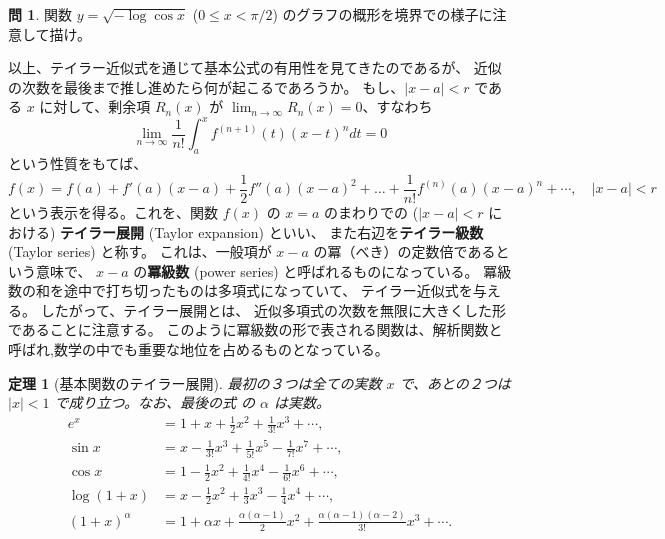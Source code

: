 \documentclass[a4paper]{jsarticle}
\newtheorem{Theorem}{定理}[section]
\theoremstyle{definition}
\newtheorem{Exercise}{問}%
\theoremstyle{remark}
\begin{document}
\begin{Exercise}
関数 $y = \sqrt{-\log\cos x}$ ($0 \leq x < \pi/2$) のグラフの概形を境界での様子に注意して描け。
\end{Exercise}


以上、テイラー近似式を通じて基本公式の有用性を見てきたのであるが、
近似の次数を最後まで推し進めたら何が起こるであろうか。
もし、$|x-a| < r$ である $x$ に対して、剰余項 $R_n(x)$ が 
$\displaystyle \lim_{n \to \infty} R_n(x) = 0$、すなわち
\[
\lim_{n \to \infty} \frac{1}{n!} \int_a^x f^{(n+1)}(t)(x-t)^{n} dt = 0
\]
という性質をもてば、
\[
f(x) = f(a) + f'(a)(x-a) + \frac{1}{2}f''(a)(x-a)^2 + \dots + 
\frac{1}{n!} f^{(n)}(a) (x-a)^n + \cdots, 
\quad 
|x-a| < r 
\]
という表示を得る。これを、関数 $f(x)$ の $x=a$ のまわりでの ($|x-a| < r$ における) 
\textbf{テイラー展開}
(Taylor expansion) といい、
また右辺を\textbf{テイラー級数} (Taylor series) と称す。
これは、一般項が $x-a$ の冪（べき）の定数倍であるという意味で、
$x-a$ の\textbf{冪級数} (power series) と呼ばれるものになっている。
冪級数の和を途中で打ち切ったものは多項式になっていて、
テイラー近似式を与える。
したがって、テイラー展開とは、
近似多項式の次数を無限に大きくした形であることに注意する。
このように冪級数の形で表される関数は、解析関数と呼ばれ,数学の中でも重要な地位を占めるものとなっている。


\begin{Theorem}[基本関数のテイラー展開]
最初の３つは全ての実数 $x$ で、あとの２つは $|x| < 1$ で成り立つ。なお、最後の式 の $\alpha$ は実数。
\begin{align}
e^x
&= 1 + x + \frac{1}{2}x^2 + \frac{1}{3!}x^3 + \cdots,\\
\sin x &= x - \frac{1}{3!}x^3 + \frac{1}{5!}x^5 - \frac{1}{7!}x^7 + \cdots,\\
\cos x &= 1 - \frac{1}{2}x^2 + \frac{1}{4!}x^4 - \frac{1}{6!}x^6 + \cdots,\\
\log(1+x) &= x - \frac{1}{2}x^2 + \frac{1}{3}x^3 - \frac{1}{4}x^4 + \cdots,\\
(1+x)^\alpha &= 1 + \alpha x + \frac{\alpha(\alpha-1)}{2}x^2 + 
\frac{\alpha(\alpha-1)(\alpha -2)}{3!}x^3 + \cdots.
\end{align}
\end{Theorem}
\end{document}
